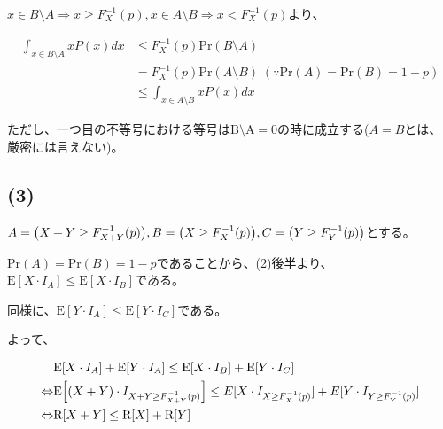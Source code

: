 \documentclass[a4paper, 10pt, dvipdfmx]{jlreq}
\begin{document}
$x \in B \setminus A \Rightarrow x \geq F_X^{-1}(p), x \in A \setminus B \Rightarrow x < F_X^{-1}(p)$より、

\begin{align*}
  \int_{x\in B \setminus A} xP(x)dx & \leq F_X^{-1}(p)\mathrm{Pr}(B \setminus A)                                              \\
                                    & = F_X^{-1}(p)\mathrm{Pr}(A \setminus B) \; (\because \mathrm{Pr}(A)=\mathrm{Pr}(B)=1-p) \\
                                    & \leq \int_{x\in A \setminus B} xP(x)dx
\end{align*}

ただし、一つ目の不等号における等号は$\mathrm{B \setminus A}=0$の時に成立する($A=B$とは、厳密には言えない)。

\subsection*{(3)}

$A=\qty(X+Y \geq F_{X+Y}^{-1}(p)),B=\qty(X \geq F_X^{-1}(p)),C=\qty(Y \geq F_Y^{-1}(p))$とする。

$\mathrm{Pr}(A)=\mathrm{Pr}(B)=1-p$であることから、(2)後半より、$\mathrm{E}[X \cdot I_A] \leq \mathrm{E}[X \cdot I_B]$である。

同様に、$\mathrm{E}[Y \cdot I_A] \leq \mathrm{E}[Y \cdot I_C]$である。

よって、

\begin{align*}
                  & \mathrm{E}[X \cdot I_A]+ \mathrm{E}[Y \cdot I_A] \leq \mathrm{E}[X \cdot I_B] + \mathrm{E}[Y \cdot I_C]                             \\
  \Leftrightarrow & \mathrm{E}\qty[(X+Y) \cdot I_{X+Y \geq F_{X+Y}^{-1}(p)}] \leq E[X \cdot I_{X \geq F_X^{-1}(p)}] + E[Y \cdot I_{Y \geq F_Y^{-1}(p)}] \\
  \Leftrightarrow & \mathrm{R}[X+Y] \leq \mathrm{R}[X] + \mathrm{R}[Y]
\end{align*}
\end{document}
